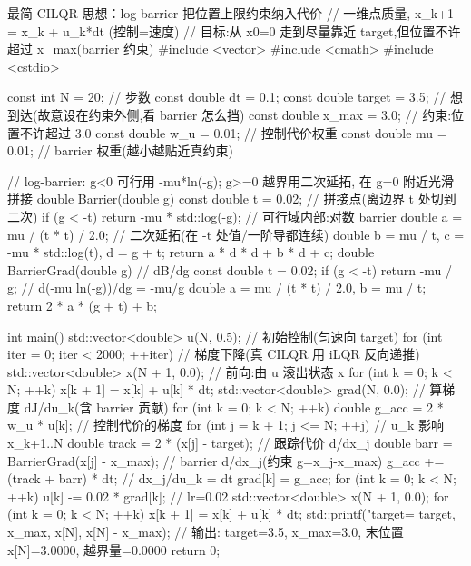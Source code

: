 \begin{codebox}[C++]{最简 CILQR 思想：log-barrier 把位置上限约束纳入代价}
// 一维点质量, x_{k+1} = x_k + u_k*dt (控制=速度)
// 目标:从 x0=0 走到尽量靠近 target,但位置不许超过 x_max(barrier 约束)
#include <vector>
#include <cmath>
#include <cstdio>

const int    N      = 20;       // 步数
const double dt     = 0.1;
const double target = 3.5;      // 想到达(故意设在约束外侧,看 barrier 怎么挡)
const double x_max  = 3.0;      // 约束:位置不许超过 3.0
const double w_u    = 0.01;     // 控制代价权重
const double mu     = 0.01;     // barrier 权重(越小越贴近真约束)

// log-barrier: g<0 可行用 -mu*ln(-g); g>=0 越界用二次延拓, 在 g=0 附近光滑拼接
double Barrier(double g) {
  const double t = 0.02;                          // 拼接点(离边界 t 处切到二次)
  if (g < -t) return -mu * std::log(-g);          // 可行域内部:对数 barrier
  double a = mu / (t * t) / 2.0;                  // 二次延拓(在 -t 处值/一阶导都连续)
  double b = mu / t, c = -mu * std::log(t), d = g + t;
  return a * d * d + b * d + c;
}
double BarrierGrad(double g) {                    // dB/dg
  const double t = 0.02;
  if (g < -t) return -mu / g;                     // d(-mu ln(-g))/dg = -mu/g
  double a = mu / (t * t) / 2.0, b = mu / t;
  return 2 * a * (g + t) + b;
}

int main() {
  std::vector<double> u(N, 0.5);                  // 初始控制(匀速向 target)
  for (int iter = 0; iter < 2000; ++iter) {       // 梯度下降(真 CILQR 用 iLQR 反向递推)
    std::vector<double> x(N + 1, 0.0);            // 前向:由 u 滚出状态 x
    for (int k = 0; k < N; ++k) x[k + 1] = x[k] + u[k] * dt;
    std::vector<double> grad(N, 0.0);             // 算梯度 dJ/du_k(含 barrier 贡献)
    for (int k = 0; k < N; ++k) {
      double g_acc = 2 * w_u * u[k];              // 控制代价的梯度
      for (int j = k + 1; j <= N; ++j) {          // u_k 影响 x_{k+1..N}
        double track = 2 * (x[j] - target);       // 跟踪代价 d/dx_j
        double barr  = BarrierGrad(x[j] - x_max); // barrier d/dx_j(约束 g=x_j-x_max)
        g_acc += (track + barr) * dt;             // dx_j/du_k = dt
      }
      grad[k] = g_acc;
    }
    for (int k = 0; k < N; ++k) u[k] -= 0.02 * grad[k];  // lr=0.02
  }
  std::vector<double> x(N + 1, 0.0);
  for (int k = 0; k < N; ++k) x[k + 1] = x[k] + u[k] * dt;
  std::printf("target=%
              target, x_max, x[N], x[N] - x_max);
  // 输出: target=3.5, x_max=3.0, 末位置 x[N]=3.0000, 越界量=0.0000
  return 0;
}
\end{codebox}

